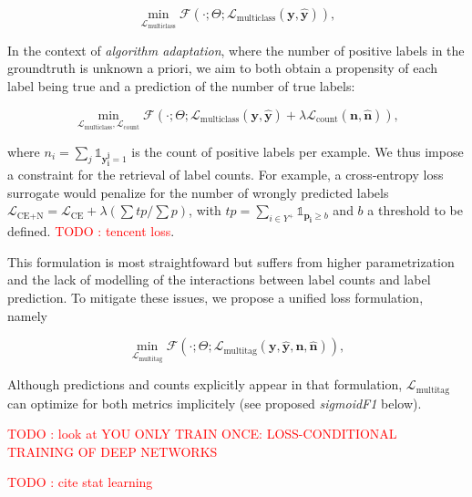 \documentclass[sigconf,natbib,screen=true,review=true,anonymous]{acmart}
\newcommand\todo[1]{\textcolor{red}{TODO : #1}}
\begin{document}
\begin{equation}
\underset{\mathcal{L}_{\text {multiclass}}} {\min} \mathcal{F}\left(\cdot ; \Theta; \mathcal{L}_{\text {multiclass}} (\mathbf{y}, \hat{\mathbf{y}}) \right),
\end{equation}

In the context of \emph{algorithm adaptation}, where the number of positive labels in the groundtruth is unknown a priori, we aim to both obtain a propensity of each label being true and a prediction of the number of true labels: 

\begin{equation}
\underset{\mathcal{L}_{\text {multiclass}}, \mathcal{L}_{\text {count}}} {\min} \mathcal{F}\left(\cdot ; \Theta; \mathcal{L}_{\text {multiclass}} (\mathbf{y}, \hat{\mathbf{y}}) + \lambda \mathcal{L}_{\text {count}} (\mathbf{n}, \hat{\mathbf{n}})\right),
\end{equation}

where \(n_i = \sum_j \mathds{1}_{\mathbf{y_i^j} = 1}\) is the count of positive labels per example. We thus impose a constraint for the retrieval of label counts. For example, a cross-entropy loss surrogate would penalize for the number of wrongly predicted labels \(\mathcal{L}_{\text {CE+N}}= \mathcal{L}_{\text {CE}} + \lambda (\sum tp / \sum p)\), with \(t p=\sum_{i \in Y^{+}} \mathds{1}_{\mathbf{p_i} \geq b}\) and \(b\) a threshold to be defined. \todo{tencent loss}.

This formulation is most straightfoward but suffers from higher parametrization and the lack of modelling of the interactions between label counts and label prediction. To mitigate these issues, we propose a unified loss formulation, namely

\begin{equation}
\underset{\mathcal{L}_{\text {multitag}}} {\min} \mathcal{F}\left(\cdot ; \Theta; \mathcal{L}_{\text {multitag}} (\mathbf{y}, \hat{\mathbf{y}}, \mathbf{n}, \hat{\mathbf{n}}) \right),
\end{equation}

Although predictions and counts explicitly appear in that formulation, \(\mathcal{L}_{\text {multitag}}\) can optimize for both metrics implicitely (see proposed \emph{sigmoidF1} below).


\todo{look at YOU ONLY TRAIN ONCE: LOSS-CONDITIONAL TRAINING OF DEEP NETWORKS}

\todo{cite stat learning}   \cite[p. 308-310]{statLearning}


\end{document}
